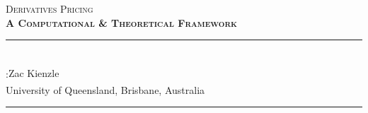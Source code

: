 \documentclass[12pt, a4paper]{article}
\begin{document}
\begin{titlepage}
	\colorbox{black!5}{%
		\parbox[t]{0.975\textwidth}{%
			\parbox[t]{0.95\textwidth}{%
				\raggedleft\vspace{0.75cm}\Huge\scshape
				Derivatives Pricing \\[7.5pt]
				\large\bfseries A Computational \& Theoretical Framework
				\vspace{0.75cm}
			}
		}
	}
	\vfill
	\parbox[t]{0.95\textwidth}{%
		\hfill\rule{0.15\linewidth}{0.5pt}\\[7.5pt]
		\raggedleft{}
		\textcopyright:{Zac Kienzle\textsuperscript{\textdagger}}\\[4pt]
		\normalsize\textsuperscript{\textdagger} University of Queensland, Brisbane, Australia\\
		\hfill\rule{0.15\linewidth}{0.5pt}
	}
\end{titlepage}
\end{document}
